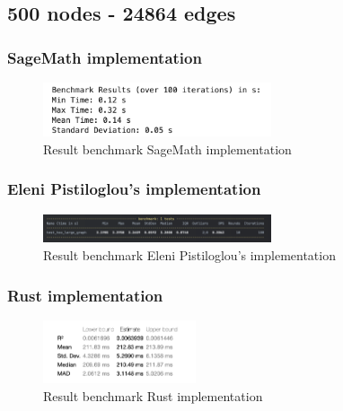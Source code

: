 \newpage


\subsection{500 nodes - 24864 edges}\label{subsec:result-for-graphs-500-24864}

\subsubsection*{SageMath implementation}
\begin{figure}[!h]
    \centering
    \includegraphics[width=0.60\textwidth]{images/benchmark/graph_500_24864/benchmark_graph_500_24864_sagemath}
    \caption{Result benchmark SageMath implementation}
    \label{fig:benchmark-graph-500-24864-sagemath}
\end{figure}

\subsubsection*{Eleni Pistiloglou's implementation}
\begin{figure}[!h]
    \centering
    \includegraphics[width=0.60\textwidth]{images/benchmark/graph_500_24864/benchmark_graph_500_24864_python}
    \caption{Result benchmark Eleni Pistiloglou's implementation}
    \label{fig:benchmark-graph-500-24864-python}
\end{figure}

\subsubsection*{Rust implementation}
\begin{figure}[!h]
    \centering
    \includegraphics[width=0.40\textwidth]{images/benchmark/graph_500_24864/benchmark_graph_500_24864_rust}
    \caption{Result benchmark Rust implementation}
    \label{fig:benchmark-graph-500-24864-rust}
\end{figure}

